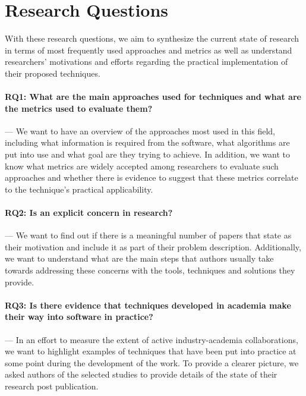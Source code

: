 \section{Research Questions}\label{sec:lit_rqs}

With these research questions, we aim to synthesize the current state of \rt research in terms of most frequently used approaches and metrics as well as understand researchers' motivations and efforts regarding the practical implementation of their proposed techniques.

\paragraph{RQ1: What are the main approaches used for \rt techniques and what are the metrics used to evaluate them?} --- We want to have an overview of the approaches most used in this field, including what information is required from the software, what algorithms are put into use and what goal are they trying to achieve. In addition, we want to know what metrics are widely accepted among researchers to evaluate such approaches and whether there is evidence to suggest that these metrics correlate to the technique's practical applicability.

\paragraph{RQ2: Is \rea an explicit concern in \rt research?} --- We want to find out if there is a meaningful number of papers that state \rea as their motivation and include it as part of their problem description. Additionally, we want to understand what are the main steps that authors usually take towards addressing these concerns with the tools, techniques and solutions they provide.
    
\paragraph{RQ3: Is there evidence that techniques developed in academia make their way into software in practice?} --- In an effort to measure the extent of active industry-academia collaborations, we want to highlight examples of techniques that have been put into practice at some point during the development of the work. To provide a clearer picture, we asked authors of the selected studies to provide details of the state of their research post publication.